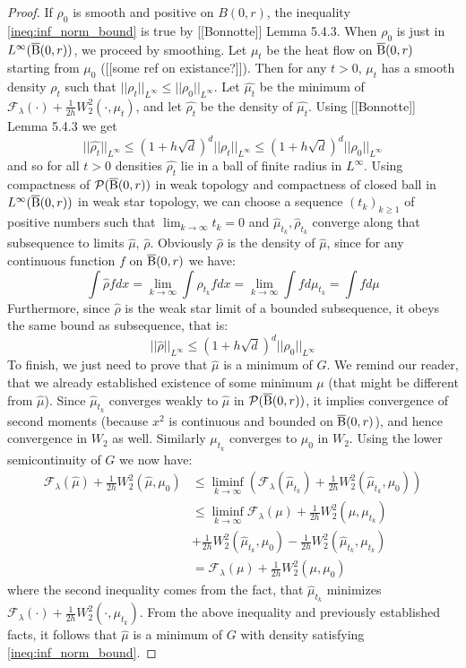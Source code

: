 \begin{proof}
If $\rho_0$ is smooth and positive on $B(0,r)$, the inequality \ref{ineq:inf_norm_bound} is true by [[Bonnotte]] Lemma 5.4.3. When $\rho_0$ is just in $L^{\infty}(\operatorname{\overline{B}}(0,r))$, we proceed by smoothing. Let $\mu_t$ be the heat flow on $\operatorname{\overline{B}}(0,r)$ starting from $\mu_0$ ([[some ref on existance?]]). Then for any $t > 0$, $\mu_t$ has a smooth density $\rho_t$ such that $||\rho_t||_{L^{\infty}} \leq ||\rho_0||_{L^{\infty}}$. Let $\hat{\mu_t}$ be the minimum of $ \mathcal{F}_{\lambda}(\cdot) + \frac{1}{2h} W_2^2(\cdot, \mu_t)$, and let $\hat{\rho_t}$ be the density of $\hat{\mu_t}$. Using [[Bonnotte]] Lemma 5.4.3 we get 
\[
||\hat{\rho_t} ||_{L^{\infty}} \leq (1 + h\sqrt{d})^d ||\rho_t||_{L^{\infty}} \leq (1 + h\sqrt{d})^d ||\rho_0||_{L^{\infty}}
\]
and so for all $t>0$ densities $\hat{\rho_t}$ lie in a ball of finite radius in $L^{\infty}$.  Using compactness of $\mathcal{P}(\operatorname{\overline{B}}(0,r))$ in weak topology and compactness of closed ball in $L^{\infty}(\operatorname{\overline{B}}(0,r))$ in weak star topology, we can choose a sequence $(t_k)_{k \geq 1}$  of positive numbers such that $\lim_{k \rightarrow \infty} t_k = 0$ and $\hat{\mu}_{t_k} , \hat{\rho}_{t_k}$ converge along that subsequence to limits $\hat{\mu}$, $\hat{\rho}$. Obviously $\hat{\rho}$ is the density of $\hat{\mu}$, since for any continuous function $f$  on $\operatorname{\overline{B}}(0,r)$ we have:
\[
\int \hat{\rho} f dx = \lim_{k \rightarrow \infty} \int \rho_{t_k} f dx = \lim_{k \rightarrow \infty} \int f d\mu_{t_k} = \int f d\mu
\]
Furthermore, since $\hat{\rho}$ is the weak star limit of a bounded subsequence, it obeys the same bound as subsequence, that is:
\[
||\hat{\rho} ||_{L^{\infty}} \leq (1 + h\sqrt{d})^d ||\rho_0||_{L^{\infty}}
\]
To finish, we just need to prove that $\hat{\mu}$ is a minimum of $G$. We remind our reader, that we already established existence of some minimum $\mu$ (that might be different from $\hat{\mu}$). Since $\hat{\mu}_{t_k}$ converges weakly to $\hat{\mu}$ in $\mathcal{P}(\operatorname{\overline{B}}(0,r))$, it implies convergence of second moments (because $x^2$ is continuous and bounded on $\operatorname{\overline{B}}(0,r)$), and hence convergence in $W_2$ as well. Similarly $\mu_{t_k}$ converges to $\mu_0$ in $W_2$. Using the lower semicontinuity of $G$ we now have:
\[
\begin{aligned}
\mathcal{F}_{\lambda}(\hat{\mu}) + \frac{1}{2h} W_2^2(\hat{\mu}, \mu_0)  & \leq \liminf_{k \rightarrow \infty} \left( \mathcal{F}_{\lambda}(\hat{\mu}_{t_k}) + \frac{1}{2h} W_2^2(\hat{\mu}_{t_k} , \mu_0) \right) \\
& \leq \liminf_{k \rightarrow \infty}  \mathcal{F}_{\lambda}(\mu) + \frac{1}{2h} W_2^2(\mu , \mu_{t_k})   \\
& + \frac{1}{2h}  W_2^2(\hat{\mu}_{t_k}, \mu_0) - \frac{1}{2h} W_2^2(\hat{\mu}_{t_k}, \mu_{t_k})   \\
& = \mathcal{F}_{\lambda} (\mu) + \frac{1}{2h} W_2^2(\mu, \mu_0) 
\end{aligned}
\]
where the second inequality comes from the fact, that $\hat{\mu}_{t_k}$ minimizes $\mathcal{F}_{\lambda}(\cdot) + \frac{1}{2h}W_2^2(\cdot, \mu_{t_k})$. From the above inequality and previously established facts, it follows that $\hat{\mu}$ is a minimum of $G$ with density satisfying \ref{ineq:inf_norm_bound}.
\end{proof}

